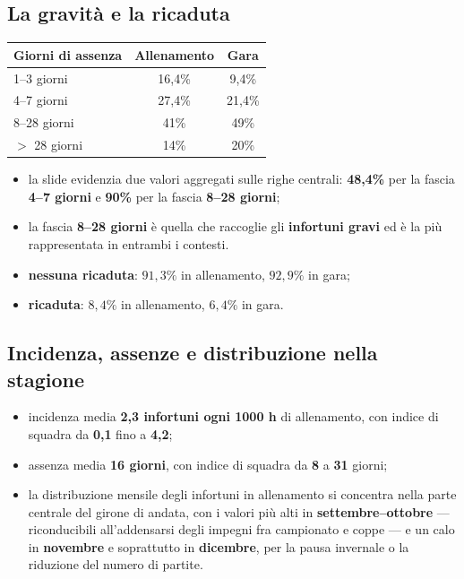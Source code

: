\subsection{La gravità e la ricaduta}

\begin{table}[htbp]
  \centering
  \small
  \renewcommand{\arraystretch}{1.3}
  \begin{tabularx}{\textwidth}{|X|c|c|}
    \hline
    \textbf{Giorni di assenza} & \textbf{Allenamento} & \textbf{Gara} \\
    \hline
    1--3 giorni & 16,4\% & 9,4\% \\
    \hline
    4--7 giorni & 27,4\% & 21,4\% \\
    \hline
    8--28 giorni & 41\% & 49\% \\
    \hline
    $>$ 28 giorni & 14\% & 20\% \\
    \hline
  \end{tabularx}
\end{table}

\begin{itemize}
  \item la slide evidenzia due valori aggregati sulle righe centrali: \textbf{48,4\%} per la fascia
    \textbf{4--7 giorni} e \textbf{90\%} per la fascia \textbf{8--28 giorni};
  \item la fascia \textbf{8--28 giorni} è quella che raccoglie gli \textbf{infortuni gravi} ed è la
    più rappresentata in entrambi i contesti.
\end{itemize}

\begin{itemize}
  \item \textbf{nessuna ricaduta}: $91,3\%$ in allenamento, $92,9\%$ in gara;
  \item \textbf{ricaduta}: $8,4\%$ in allenamento, $6,4\%$ in gara.
\end{itemize}

\subsection{Incidenza, assenze e distribuzione nella stagione}

\begin{itemize}
  \item incidenza media \textbf{2,3 infortuni ogni 1000 h} di allenamento, con indice di squadra da
    \textbf{0,1} fino a \textbf{4,2};
  \item assenza media \textbf{16 giorni}, con indice di squadra da \textbf{8} a \textbf{31} giorni;
  \item la distribuzione mensile degli infortuni in allenamento si concentra nella parte centrale
    del girone di andata, con i valori più alti in \textbf{settembre--ottobre} --- riconducibili
    all'addensarsi degli impegni fra campionato e coppe --- e un calo in \textbf{novembre} e
    soprattutto in \textbf{dicembre}, per la pausa invernale o la riduzione del numero di partite.
\end{itemize}

